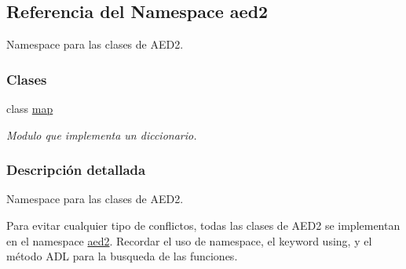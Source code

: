 \hypertarget{namespaceaed2}{}\subsection{Referencia del Namespace aed2}
\label{namespaceaed2}


Namespace para las clases de A\+E\+D2.  


\subsubsection*{Clases}
\begin{DoxyCompactItemize}
\item 
class \hyperlink{classaed2_1_1map}{map}
\begin{DoxyCompactList}\small\item\em Modulo que implementa un diccionario. \end{DoxyCompactList}\end{DoxyCompactItemize}


\subsubsection{Descripción detallada}
Namespace para las clases de A\+E\+D2. 

Para evitar cualquier tipo de conflictos, todas las clases de A\+E\+D2 se implementan en el namespace \hyperlink{namespaceaed2}{aed2}. Recordar el uso de {\ttfamily namespace}, el keyword {\ttfamily using}, y el método A\+DL para la busqueda de las funciones. 